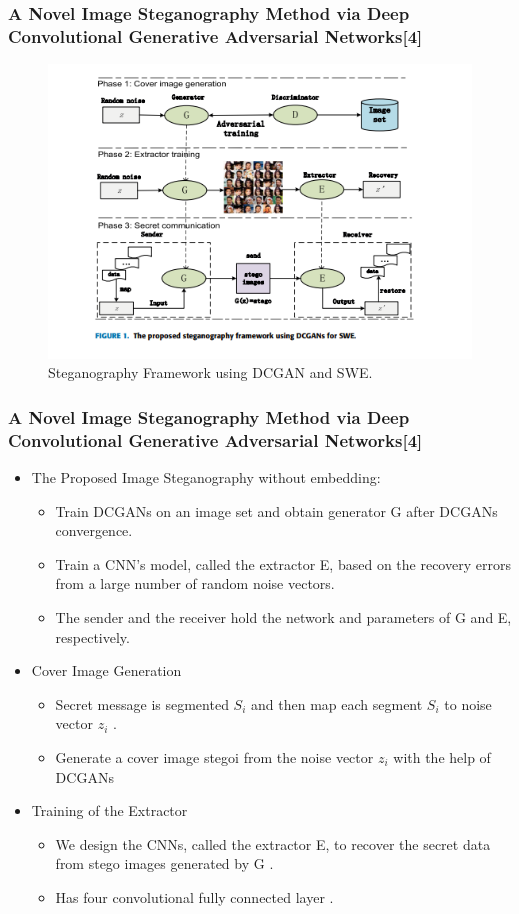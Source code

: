 \documentclass{beamer} %
\theoremstyle{definition} %
\begin{document}
\begin{frame}
\frametitle{A Novel Image Steganography Method via Deep Convolutional Generative Adversarial Networks[4] }
\begin{figure}
\includegraphics[scale=0.5]{DCGANSWE.png}
\caption{Steganography Framework using DCGAN and SWE.}
\end{figure}
\end{frame}
\begin{frame}
\frametitle{A Novel Image Steganography Method via Deep Convolutional Generative Adversarial Networks[4]}
\begin{itemize}
	\item The Proposed Image Steganography without embedding: 
	\begin{itemize}
		\item Train DCGANs on an image set and obtain generator G after DCGANs convergence.
		\item Train a CNN's model, called the extractor E, based on the recovery errors from a large number of random noise vectors. 
		\item The sender and the receiver hold the network and
		parameters of G and E, respectively. 
	\end{itemize}
   \item Cover Image Generation 
   \begin{itemize}
       \item Secret message is segmented $S_i$ and then map each segment $S_i$
       to noise vector $z_i$ .
       \item Generate a cover image stegoi from the noise vector $z_i$ with the help of DCGANs
   \end{itemize}
 \item Training of the Extractor
  \begin{itemize}
  	\item We design the CNNs, called the extractor E, to recover the
  	secret data from stego images generated by G .  
  	\item Has four convolutional fully connected layer . 
  \end{itemize}
\end{itemize}
\end{frame}
\end{document}
